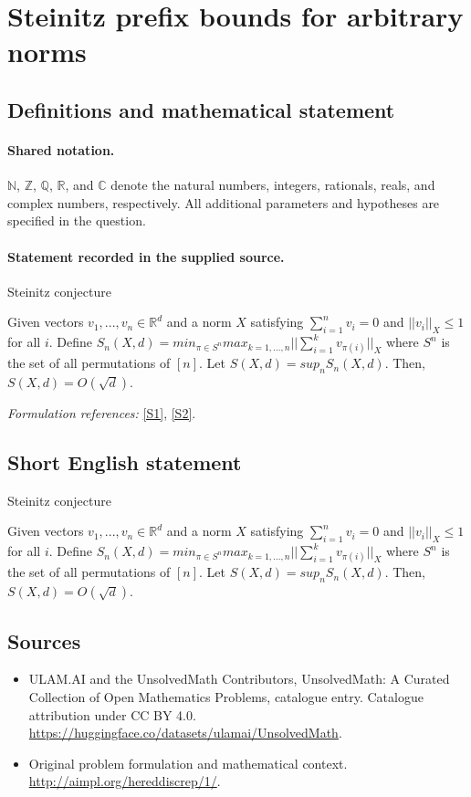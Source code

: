 \documentclass[11pt]{article}
\newcommand{\sref}[2]{\hyperlink{source:#1:#2}{[S#2]}}
\begin{document}
\section{Steinitz prefix bounds for arbitrary norms}\label{statement}

\subsection{Definitions and mathematical statement}

\paragraph{Shared notation.}$\mathbb N$, $\mathbb Z$, $\mathbb Q$, $\mathbb R$, and $\mathbb C$ denote the natural numbers, integers, rationals, reals, and complex numbers, respectively. All additional parameters and hypotheses are specified in the question.


\paragraph{Statement recorded in the supplied source.}
Steinitz conjecture

Given vectors $v_1,...,v_n\in\mathbb{R}^d$ and a norm $X$ satisfying $\sum_{i=1}^n v_i=0$ and $||v_i||_X\le 1$ for all $i$. Define $S_n(X,d)=min_{\pi\in S^n}max_{k=1,...,n}|| \sum_{i=1}^k v_{\pi(i)}||_X$ where $S^n$ is the set of all permutations of $[n]$. Let $S(X,d)=sup_n S_n(X,d)$. Then, $S(X,d) =O(\sqrt{d})$.
\par\smallskip\textit{Formulation references:} \sref{statement}{1}, \sref{statement}{2}.
\subsection{Short English statement}
Steinitz conjecture

Given vectors $v_1,...,v_n\in\mathbb{R}^d$ and a norm $X$ satisfying $\sum_{i=1}^n v_i=0$ and $||v_i||_X\le 1$ for all $i$. Define $S_n(X,d)=min_{\pi\in S^n}max_{k=1,...,n}|| \sum_{i=1}^k v_{\pi(i)}||_X$ where $S^n$ is the set of all permutations of $[n]$. Let $S(X,d)=sup_n S_n(X,d)$. Then, $S(X,d) =O(\sqrt{d})$.
\subsection{Sources}
\begin{itemize}
\item[\hypertarget{source:statement:1}{S1}] ULAM.AI and the UnsolvedMath Contributors, UnsolvedMath: A Curated Collection of Open Mathematics Problems, catalogue entry. Catalogue attribution under CC BY 4.0.
\url{https://huggingface.co/datasets/ulamai/UnsolvedMath}.
\item[\hypertarget{source:statement:2}{S2}] Original problem formulation and mathematical context.
\url{http://aimpl.org/hereddiscrep/1/}.
\end{itemize}
\label{end:statement}
\end{document}

